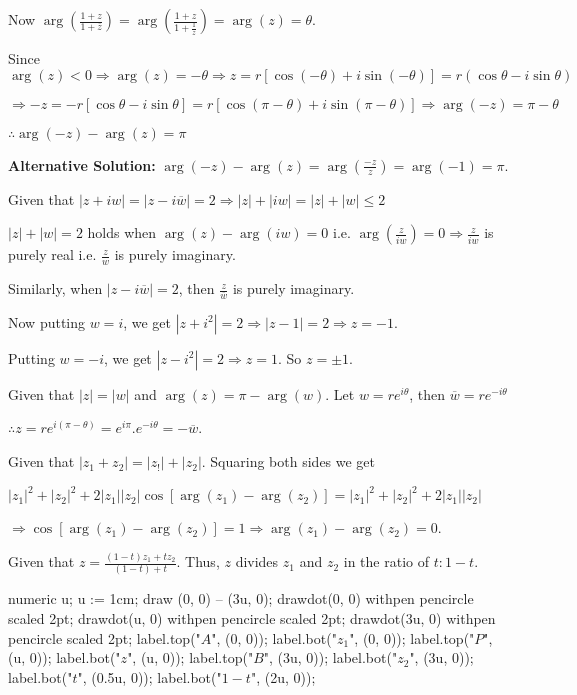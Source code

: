   Now $\arg\left(\frac{1 + z}{1 + \overline{z}}\right) = \arg\left(\frac{1 + z}{1 + \frac{1}{z}}\right) =
  \arg(z) = \theta$.
\item Since $\arg(z) < 0 \Rightarrow \arg(z) = -\theta\Rightarrow z = r[\cos(-\theta) + i\sin(-\theta)] =
  r(\cos\theta - i\sin\theta)$

  $\Rightarrow -z = -r[\cos\theta - i\sin\theta] = r[\cos(\pi - \theta) + i\sin(\pi - \theta)]\Rightarrow
  \arg(-z) = \pi - \theta$

  $\therefore \arg(-z) - \arg(z) = \pi$

  {\bf Alternative Solution:} $\arg(-z) - \arg(z) = \arg\left(\frac{-z}{z}\right) = \arg(-1) = \pi$.
\item Given that $|z + iw| = |z - i\overline{w}| = 2\Rightarrow |z| + |iw| = |z| + |w|\leq 2$

  $|z| + |w| = 2$ holds when $\arg(z) - \arg(iw) = 0$ i.e. $\arg\left(\frac{z}{iw}\right) = 0\Rightarrow
  \frac{z}{iw}$ is purely real i.e. $\frac{z}{w}$ is purely imaginary.

  Similarly, when $|z - i\overline{w}| = 2$, then $\frac{z}{\overline{w}}$ is purely imaginary.

  Now putting $w = i$, we get $|z + i^2| = 2 \Rightarrow |z - 1| = 2\Rightarrow z = -1$.

  Putting $w = -i$, we get $|z - i^2| = 2\Rightarrow z = 1$. So $z = \pm1$.
\item Given that $|z| = |w|$ and $\arg(z) = \pi - \arg(w)$. Let $w = re^{i\theta}$, then $\overline{w} =
  re^{-i\theta}$

  $\therefore z = re^{i(\pi - \theta)} = e^{i\pi}.e^{-i\theta} = -\overline{w}$.
\item Given that $|z_1 + z_2| = |z_!| + |z_2|$. Squaring both sides we get

  $|z_1|^2 + |z_2|^2 + 2|z_1||z_2|\cos[\arg(z_1) - \arg(z_2)] = |z_1|^2 + |z_2|^2 + 2|z_1||z_2|$

  $\Rightarrow \cos[\arg(z_1) - \arg(z_2)] = 1\Rightarrow \arg(z_1) - \arg(z_2) = 0$.
\item Given that $z = \frac{(1 - t)z_1 + tz_2}{(1 - t) + t}$. Thus, $z$ divides $z_1$ and $z_2$ in the ratio
  of $t: 1- t$.

  \startplacefigure[location=force]
    \startMPcode
      numeric u;
      u := 1cm;
      draw (0, 0) -- (3u, 0);
      drawdot(0, 0) withpen pencircle scaled 2pt;
      drawdot(u, 0) withpen pencircle scaled 2pt;
      drawdot(3u, 0) withpen pencircle scaled 2pt;
      label.top("$A$", (0, 0));
      label.bot("$z_1$", (0, 0));
      label.top("$P$", (u, 0));
      label.bot("$z$", (u, 0));
      label.top("$B$", (3u, 0));
      label.bot("$z_2$", (3u, 0));
      label.bot("$t$", (0.5u, 0));
      label.bot("$1 - t$", (2u, 0));
    \stopMPcode
  \stopplacefigure

